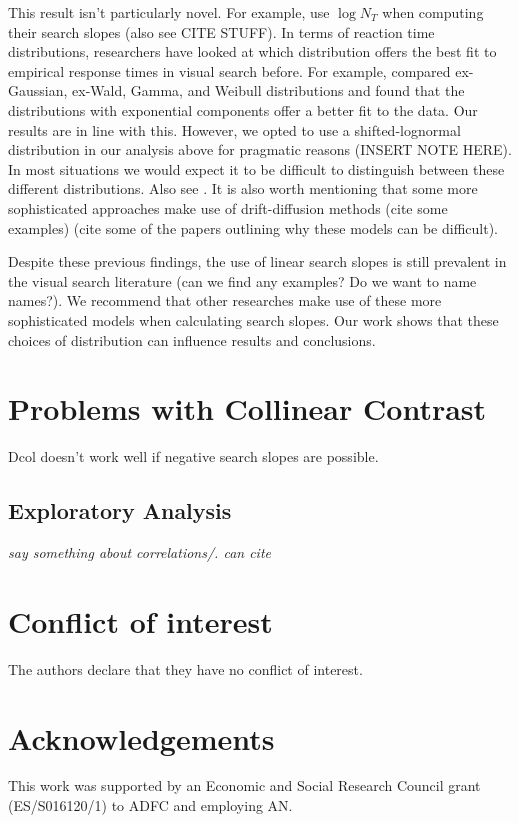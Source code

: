 \documentclass[preprint,12pt,authoryear]{elsarticle}
\begin{document}
This result isn't particularly novel. For example, \cite{buetti2019predicting} use $\log{N_T}$ when computing their search slopes (also see CITE STUFF). In terms of reaction time distributions, researchers have looked at which distribution offers the best fit to empirical response times in visual search before. For example, \cite{palmer2011shapes} compared ex-Gaussian, ex-Wald, Gamma, and Weibull distributions and found that the distributions with exponential components offer a better fit to the data. Our results are in line with this. However, we opted to use a shifted-lognormal distribution in our analysis above for pragmatic reasons (INSERT NOTE HERE). In most situations we would expect it to be difficult to distinguish between these different distributions. Also see \citep{wolfe2010reaction}. It is also worth mentioning that some more sophisticated approaches make use of drift-diffusion methods (cite some examples) (cite some of the papers outlining why these models can be difficult).  

Despite these previous findings, the use of linear search slopes is still prevalent in the visual search literature (can we find any examples? Do we want to name names?). We recommend that other researches make use of these more sophisticated models when calculating search slopes. Our work shows that these choices of distribution can influence results and conclusions.

\section{Problems with Collinear Contrast}

Dcol doesn't work well if negative search slopes are possible. 

\subsection{Exploratory Analysis}


\textit{say something about correlations/. can cite \cite{clarke2020stable}}

%
\section*{Conflict of interest}
The authors declare that they have no conflict of interest.

\section*{Acknowledgements}
This work was supported by an Economic and Social Research Council grant (ES/S016120/1) to ADFC and employing AN.

\end{document}
